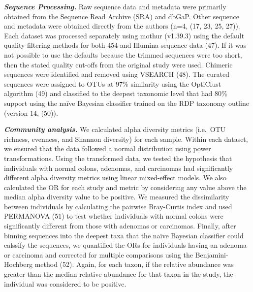 \documentclass[12pt,]{article}
\begin{document}
\textbf{\emph{Sequence Processing.}} Raw sequence data and metadata were
primarily obtained from the Sequence Read Archive (SRA) and dbGaP. Other
sequence and metadata were obtained directly from the authors (n=4, (17,
23, 25, 27)). Each dataset was processed separately using mothur
(v1.39.3) using the default quality filtering methods for both 454 and
Illumina sequence data (47). If it was not possible to use the defaults
because the trimmed sequences were too short, then the stated quality
cut-offs from the original study were used. Chimeric sequences were
identified and removed using VSEARCH (48). The curated sequences were
assigned to OTUs at 97\% similarity using the OptiClust algorithm (49)
and classified to the deepest taxonomic level that had 80\% support
using the naïve Bayesian classifier trained on the RDP taxonomy outline
(version 14, (50)).

\textbf{\emph{Community analysis.}} We calculated alpha diversity
metrics (i.e.~OTU richness, evenness, and Shannon diversity) for each
sample. Within each dataset, we ensured that the data followed a normal
distribution using power transformations. Using the transformed data, we
tested the hypothesis that individuals with normal colons, adenomas, and
carcinomas had significantly different alpha diversity metrics using
linear mixed-effect models. We also calculated the OR for each study and
metric by considering any value above the median alpha diversity value
to be positive. We measured the dissimilarity between individuals by
calculating the pairwise Bray-Curtis index and used PERMANOVA (51) to
test whether individuals with normal colons were significantly different
from those with adenomas or carcinomas. Finally, after binning sequences
into the deepest taxa that the naïve Bayesian classifier could calssify
the sequences, we quantified the ORs for individuals having an adenoma
or carcinoma and corrected for multiple comparisons using the
Benjamini-Hochberg method (52). Again, for each taxon, if the relative
abundance was greater than the median relative abundance for that taxon
in the study, the individual was considered to be positive.
\end{document}
